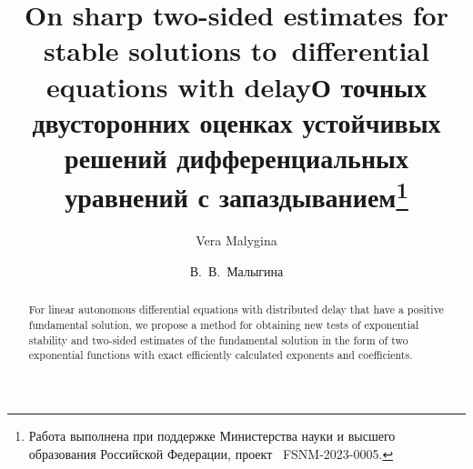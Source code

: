 \begin{englishtitle} %
\title{On sharp two-sided estimates for stable solutions to~differential equations with delay}
\author{Vera Malygina
}

\maketitle

\begin{abstract}
For linear autonomous differential equations with distributed delay that have a positive fundamental solution, we propose a method for obtaining new tests of exponential stability and two-sided estimates of the fundamental solution in the form of two exponential functions with exact efficiently calculated exponents and coefficients.

\end{abstract}
\end{englishtitle}


\iffalse
\documentclass[12pt]{llncs}


\usepackage{iftex}

\ifPDFTeX
\usepackage[T2A]{fontenc}
\usepackage[utf8]{inputenc} %
\usepackage[english,russian]{babel}
\fi

\usepackage{todonotes}

\usepackage[russian]{nla}



\fi
\title{О точных двусторонних оценках устойчивых решений дифференциальных уравнений с запаздыванием\thanks{Работа выполнена при поддержке Министерства науки и высшего образования Российской Федерации, проект \textnumero~FSNM-2023-0005.}}

\author{В.~В.~Малыгина  %
} %

